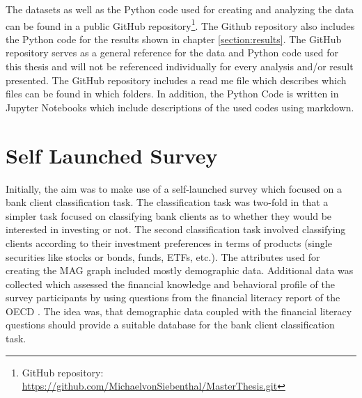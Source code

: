   \noindent The datasets as well as the Python code used for creating and 
  analyzing the data can be found in a public GitHub repository\footnote{GitHub
  repository: \url{https://github.com/MichaelvonSiebenthal/MasterThesis.git}}. 
  The Github repository also includes the Python code for the results shown in
  chapter \ref{section:results}. The GitHub repository serves as a general 
  reference for the data and Python code used for this thesis and will not be 
  referenced individually for every analysis and/or result presented. The GitHub 
  repository includes a read me file which describes which files can be 
  found in which folders. In addition, the Python Code is written in 
  Jupyter Notebooks which include descriptions of the used codes using markdown.

  \section{Self Launched Survey}
  \label{section:self_survey} 

  Initially, the aim was to make use of a self-launched survey which focused on
  a bank client classification task. The classification task was two-fold in 
  that a simpler task focused on classifying bank clients as to whether they 
  would be interested in investing or not. The second classification task
  involved classifying clients according to their investment preferences in
  terms of products (single securities like stocks or bonds, funds, ETFs,
  etc.). The attributes used for creating the MAG graph included mostly 
  demographic data. Additional data was collected which assessed the financial 
  knowledge and behavioral profile of the survey participants by using questions 
  from the financial literacy report of the OECD \citeyearpar{OECD2017}. The 
  idea was, that demographic data coupled with the financial literacy questions 
  should provide a suitable database for the bank client classification task. \\

